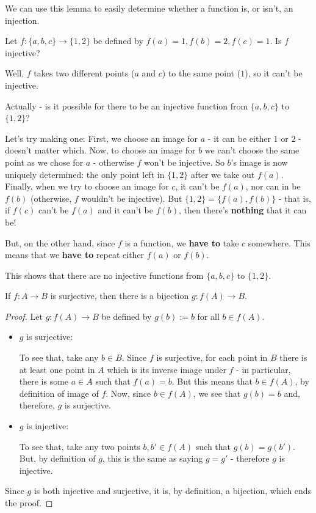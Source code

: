 We can use this lemma to easily determine whether a function is, or isn't, an injection.

\begin{ex}
	Let $f:\{a,b,c\}\to\{1,2\}$ be defined by $f(a)=1,f(b)=2,f(c)=1$. Is $f$ injective?
	
	Well, $f$ takes two different points ($a$ and $c$) to the same point ($1$), so it can't be injective.
	
	\bigskip
	Actually - is it possible for there to be an injective function from $\{a,b,c\}$ to $\{1,2\}$?
	
	Let's try making one: First, we choose an image for $a$ - it can be either $1$ or $2$ - doesn't matter which. Now, to choose an image for $b$ we can't choose the same point as we chose for $a$ - otherwise $f$ won't be injective. So $b$'s image is now uniquely determined: the only point left in $\{1,2\}$ after we take out $f(a)$. Finally, when we try to choose an image for $c$, it can't be $f(a)$, nor can in be $f(b)$ (otherwise, $f$ wouldn't be injective). But $\{1,2\}=\{f(a),f(b)\}$ - that is, if $f(c)$ can't be $f(a)$ and it can't be $f(b)$, then there's \textbf{nothing} that it can be!
	
	But, on the other hand, since $f$ is a function, we \textbf{have to} take $c$ somewhere. This means that we \textbf{have to} repeat either $f(a)$ or $f(b)$.
	
	This shows that there are no injective functions from $\{a,b,c\}$ to $\{1,2\}$.
\end{ex}

\begin{lemma}\label{lem: surj iso im}
	If $f:A\to B$ is surjective, then there is a bijection $g:f(A)\to B$.
\end{lemma}
\begin{proof}
	Let $g:f(A)\to B$ be defined by $g(b):=b$ for all $b\in f(A)$.
	\begin{itemize}
		\item $g$ is surjective:
		
		To see that, take any $b\in B$. Since $f$ is surjective, for each point in $B$ there is at least one point in $A$ which is its inverse image under $f$ - in particular, there is some $a\in A$ such that $f(a)=b$. But this means that $b\in f(A)$, by definition of image of $f$. Now, since $b\in f(A)$, we see that $g(b)=b$ and, therefore, $g$ is surjective.
		
		\item $g$ is injective:
		
		To see that, take any two points $b,b'\in f(A)$ such that $g(b)=g(b')$. But, by definition of $g$, this is the same as saying $g=g'$ - therefore $g$ is injective.		
	\end{itemize}

Since $g$ is both injective and surjective, it is, by definition, a bijection, which ends the proof.
\end{proof}

